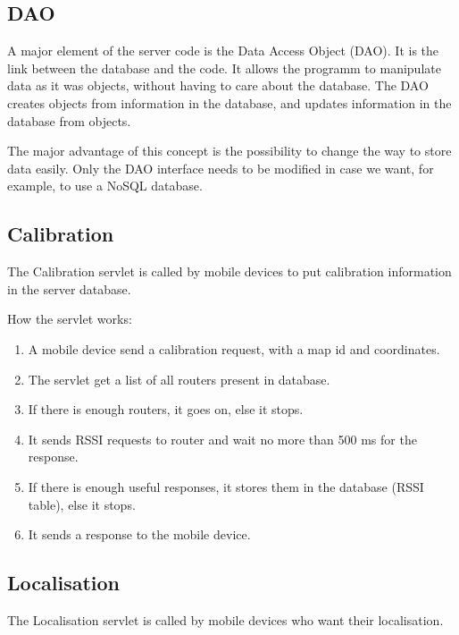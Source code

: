         \subsection{DAO}

A major element of the server code is the Data Access Object (DAO). It is the
link between the database and the code. It allows the programm to manipulate
data as it was objects, without having to care about the database. The DAO
creates objects from information in the database, and updates information in the
database from objects.

The major advantage of this concept is the possibility to change the way to
store data easily. Only the DAO interface needs to be modified in case we want,
for example, to use a NoSQL database.

        \subsection{Calibration}

The Calibration servlet is called by mobile devices to put calibration information
in the server database.

How the servlet works:
\begin{enumerate}
    \item A mobile device send a calibration request, with a map id and
        coordinates.
    \item The servlet get a list of all routers present in database.
    \item If there is enough routers, it goes on, else it stops.
    \item It sends RSSI requests to router and wait no more than 500 ms for the
        response.
    \item If there is enough useful responses, it stores them in the database
        (RSSI table), else it stops.
    \item It sends a response to the mobile device.
\end{enumerate}

        \subsection{Localisation}

The Localisation servlet is called by mobile devices who want their
localisation.


